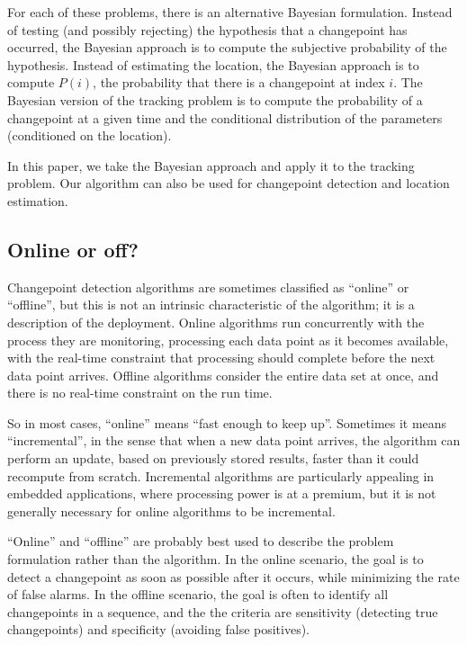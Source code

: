 \documentclass[twocolumn,11pt]{article}
\begin{document}
For each of these problems, there is an alternative Bayesian
formulation.  Instead of testing (and possibly rejecting) the
hypothesis that a changepoint has occurred, the Bayesian approach is
to compute the subjective probability of the hypothesis.  Instead of
estimating the location, the Bayesian approach is to compute $P(i)$,
the probability that there is a changepoint at index $i$.  The
Bayesian version of the tracking problem is to compute the probability
of a changepoint at a given time and the conditional distribution of
the parameters (conditioned on the location).

In this paper, we take the Bayesian approach and apply it to the
tracking problem.  Our algorithm can also be used for changepoint
detection and location estimation.

\subsection{Online or off?}

Changepoint detection algorithms are sometimes classified as
``online'' or ``offline'', but this is not an intrinsic characteristic
of the algorithm; it is a description of the deployment.  Online
algorithms run concurrently with the process they are monitoring,
processing each data point as it becomes available, with the real-time
constraint that processing should complete before the next data point
arrives.  Offline algorithms consider the entire data set at once, and
there is no real-time constraint on the run time.

So in most cases, ``online'' means ``fast enough to keep up''.
Sometimes it means ``incremental'', in the sense that when a new
data point arrives, the algorithm can perform an update, based on
previously stored results, faster than it could recompute from
scratch.  Incremental algorithms are particularly appealing in
embedded applications, where processing power is at a premium, but it
is not generally necessary for online algorithms to be incremental.

``Online'' and ``offline'' are probably best used to describe the
problem formulation rather than the algorithm.  In the online
scenario, the goal is to detect a changepoint as soon as possible
after it occurs, while minimizing the rate of false alarms.  In the
offline scenario, the goal is often to identify all changepoints
in a sequence, and the the criteria are sensitivity (detecting
true changepoints) and specificity (avoiding false positives).
\end{document}
